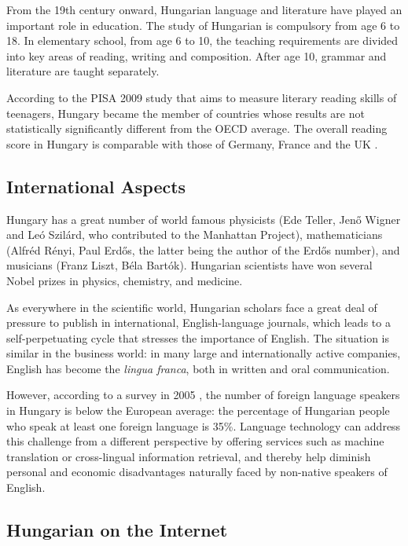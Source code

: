 \begin{multicols}{2}
  From the 19th century onward, Hungarian language and literature have played an important role in education. The study of Hungarian is compulsory from age 6 to 18. In elementary school, from age 6 to 10, the teaching requirements are divided into key areas of reading, writing and composition. After age 10, grammar and literature are taught separately.

  According to the PISA 2009 study  that aims to measure literary reading skills of teenagers, Hungary became the member of countries whose results are not statistically significantly different from the OECD average. The overall reading score in Hungary is comparable with those of Germany, France and the UK \cite{pisa}. 

  \subsection{International Aspects}

  Hungary has a great number of world famous physicists (Ede Teller, Jenő Wigner and Leó Szilárd, who contributed to the Manhattan Project), mathematicians (Alfréd Rényi, Paul Erdős, the latter being the author of the Erdős number), and musicians (Franz Liszt, Béla Bartók). Hungarian scientists have won several Nobel prizes in physics, chemistry, and medicine.

  As everywhere in the scientific world, Hungarian scholars face a great deal of pressure to publish in international, English-language journals, which leads to a self-perpetuating cycle that stresses the importance of English. The situation is similar in the business world: in many large and internationally active companies, English has become the \textit{lingua franca}, both in written and oral communication.

  However, according to a survey in 2005 \cite{tarki}, the number of foreign language speakers in Hungary is below the European average: the percentage of Hungarian people who speak at least one foreign language is 35\%. Language technology can address this challenge from a different perspective by offering services such as machine translation or cross-lingual information retrieval, and thereby help diminish personal and economic disadvantages naturally faced by non-native speakers of English. 

  \subsection{Hungarian on the Internet}


\end{multicols}
